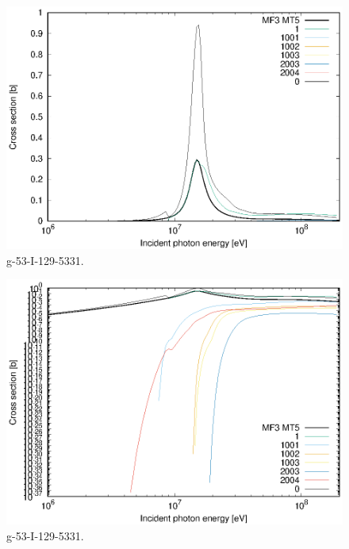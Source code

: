 \begin{figure}
 \includegraphics[width=\linewidth]{eps/g_53-I-129_5331.eps}
  \caption{g-53-I-129-5331.}
\end{figure}
\begin{figure}
 \includegraphics[width=\linewidth]{eps-log/g_53-I-129_5331.eps}
 \caption{g-53-I-129-5331.}
\end{figure}
\newpage \clearpage

